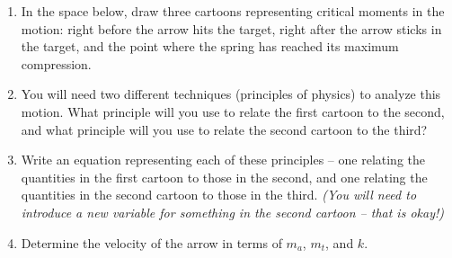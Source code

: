 \documentclass[12pt]{article}
\begin{document}
\begin{enumerate}
	\item In the space below, draw three cartoons representing critical moments in the motion: right before the arrow hits the target, right after the arrow sticks in the target, and the point where the spring has reached its maximum compression.
	\vspace{3in}
	
	\item You will need two different techniques (principles of physics) to analyze this motion. What principle will you use to relate the first cartoon to the second, and what principle will you use to relate the second cartoon to the third?
	\vspace{2in}
	\newpage
	
	\item Write an equation representing each of these principles -- one relating the quantities in the first cartoon to those in the second, and one relating the quantities in the second cartoon to those in the third. {\it (You will need to introduce a new variable for something in the second cartoon -- that is okay!)}
	
	\vspace{3in}
	
	\item Determine the velocity of the arrow in terms of $m_a$, $m_t$, and $k$.
	

\end{enumerate}
\end{document}
